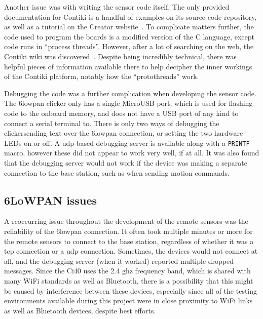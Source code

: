 Another issue was with writing the sensor code itself. The only provided
documentation for Contiki is a handful of examples on its source code
repository, as well as a tutorial on the Creator
website~\cite{clickersetupguide}. To complicate matters further, the code
used to program the boards is a modified version of the C language, except
code runs in ``process threads''. However, after a lot of searching on the
web, the Contiki wiki was discovered~\cite{contiki-wiki}. Despite being
incredibly technical, there was helpful pieces of information available there
to help decipher the inner workings of the Contiki platform, notably how the
``protothreads'' work.

Debugging the code was a further complication when developing the sensor
code. The \gls{6lowpan} clicker only has a single MicroUSB port, which is
used for flashing code to the onboard memory, and does not have a USB port of
any kind to connect a serial terminal to. There is only two ways of debugging
the clicker\textemdash{}sending text over the \gls{6lowpan} connection, or
setting the two hardware LEDs on or off. A \acrshort{udp}-based debugging
server is available along with a \texttt{PRINTF} macro, however these did not
appear to work very well, if at all. It was also found that the debugging
server would not work if the device was making a separate connection to the
base station, such as when sending motion commands.

\subsection{6LoWPAN issues}
A reoccurring issue throughout the development of the remote sensors was the
reliability of the \gls{6lowpan} connection. It often took multiple minutes
or more for the remote sensors to connect to the base station, regardless of
whether it was a \acrshort{tcp} connection or a \acrshort{udp} connection.
Sometimes, the devices would not connect at all, and the debugging server
(when it worked) reported multiple dropped messages. Since the Ci40 uses the
2.4 \acrshort{ghz} frequency band, which is shared with many WiFi standards
as well as Bluetooth, there is a possibility that this might be caused by
interference between these devices, especially since all of the testing
environments available during this project were in close proximity to WiFi
links as well as Bluetooth devices, despite best efforts.

